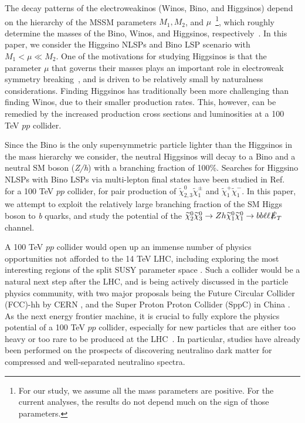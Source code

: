 \documentclass[a4paper,11pt]{article}
\newcommand{\N}{\widetilde{\chi}^0}
\newcommand{\C}{\widetilde{\chi}^\pm}
\newcommand{\met}{{\slashed{E}_T}}
\begin{document}
The decay patterns of the electroweakinos (Winos, Bino, and Higgsinos) depend
on the hierarchy of the MSSM parameters $M_1, M_2$, and $\mu$~\footnote{For our
study, we assume all the mass parameters are positive.  For the current
analyses, the results do not depend much on the sign of those parameters.},
which roughly determine the masses of the Bino, Winos, and Higgsinos,
respectively~\cite{Han:2013kza}.  In this paper, we consider the Higgsino NLSPs
and Bino LSP scenario with $M_1 < \mu \ll M_2$.  One of the motivations for
studying Higgsinos is that the parameter $\mu$ that governs their masses plays an
important role in electroweak symmetry breaking~\cite{Acharya:2014pua}, and
is driven to be relatively small by naturalness considerations. 
Finding Higgsinos has traditionally been more challenging than finding Winos,
due to their smaller production rates.
This, however, can be remedied by the increased production cross sections and 
luminosities at a 100 TeV $pp$ collider.

Since the Bino is the only supersymmetric particle lighter than the Higgsinos in
the mass hierarchy we consider, the neutral Higgsinos will decay to a Bino and a
neutral SM boson (\emph{Z/h}) with a branching fraction of 100\%.  Searches for
Higgsino NLSPs with Bino LSPs via  multi-lepton final states have been studied
in Ref.~\cite{Gori:2014oua} for a 100 TeV $pp$ collider, for pair production of
$\N_{2,3}\C_1$ and
$\widetilde\chi_{1}^+\widetilde\chi_1^-$. In this paper, we attempt to exploit
the relatively large branching fraction of the SM Higgs boson to \emph{b} quarks,
and study the potential of the $\N_2\N_3\rightarrow Zh
\N_1\N_1\rightarrow bb\ell\ell \met$ channel.

A 100 TeV $pp$ collider would open up an immense number of physics
opportunities not afforded to the 14 TeV LHC, including exploring the most
interesting regions of the split SUSY parameter space
\cite{Arkani-Hamed:2015vfh}.
Such a collider would be a natural next step after the LHC, and is being
actively discussed in the particle physics community, with two major proposals
being the Future Circular Collider (FCC)-hh by CERN \cite{FCC-hh}, and the
Super Proton Proton Collider (SppC)  in China \cite{CEPC}.  As the next energy
frontier machine, it is crucial to fully explore the physics
potential of a 100 TeV $pp$ collider, especially for new particles that are
either too heavy or too rare to be produced at the
LHC~\cite{Arkani-Hamed:2015vfh,Contino:2016spe,Golling:2016gvc,Mangano:2016jyj}.
In particular, studies have already been performed on the prospects of
discovering neutralino dark matter for compressed \cite{Low:2014cba,
diCortona:2014yua,Cirelli:2014dsa,Mahbubani:2018tin,Han:2018wus} and
well-separated \cite{Gori:2014oua,Acharya:2014pua} neutralino spectra.
\end{document}
